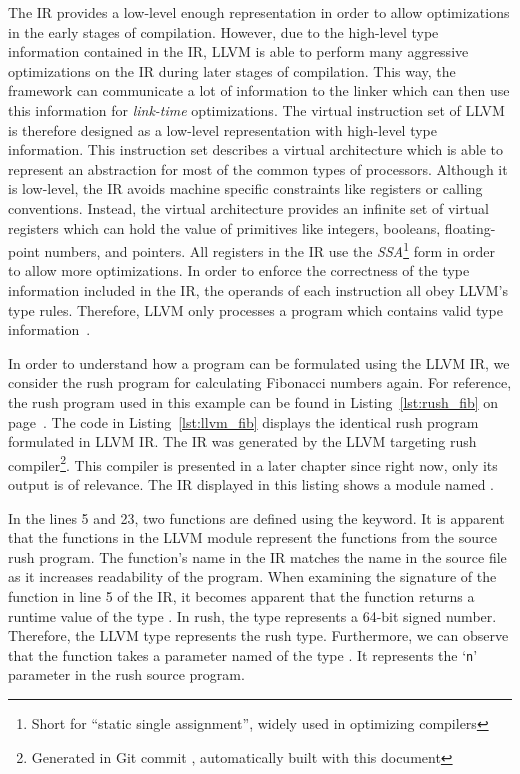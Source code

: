 The IR provides a low-level enough representation in order to allow optimizations in the early stages of compilation.
However, due to the high-level type information contained in the IR,
LLVM is able to perform many aggressive optimizations on the IR during later stages of compilation.
This way, the framework can communicate a lot of information to the linker which can then use this information for \emph{link-time} optimizations.
The virtual instruction set of LLVM is therefore designed as a low-level representation with high-level type information.
This instruction set describes a virtual architecture which is able to represent an abstraction for most of the common types of processors.
Although it is low-level, the IR avoids machine specific constraints like registers or calling conventions.
Instead, the virtual architecture provides an infinite set of virtual registers which can hold the value of primitives like integers, booleans, floating-point numbers, and pointers.
All registers in the IR use the \emph{SSA}\footnote{Short for \enquote{static single assignment}, widely used in optimizing compilers} form in order to allow more optimizations.
In order to enforce the correctness of the type information included in the IR, the operands of each instruction all obey LLVM's type rules.
Therefore, LLVM only processes a program which contains valid type information~\cite[p.~14-17]{Lattner:MSThesis02}.

In order to understand how a program can be formulated using the LLVM IR, we consider the rush program for calculating Fibonacci numbers again.
For reference, the rush program used in this example can be found in Listing~\ref{lst:rush_fib} on page~\pageref{lst:rush_fib}.
The code in Listing~\ref{lst:llvm_fib} displays the identical rush program formulated in LLVM IR\@.
The IR was generated by the LLVM targeting rush compiler\footnote{Generated in Git commit \rushCommit, automatically built with this document}.
This compiler is presented in a later chapter since right now, only its output is of relevance.
The IR displayed in this listing shows a module named .


In the lines 5 and 23, two functions are defined using the  keyword.
It is apparent that the functions in the LLVM module represent the functions from the source rush program.
The function's name in the IR matches the name in the source file as it increases readability of the program.
When examining the signature of the  function in line 5 of the IR,
it becomes apparent that the function returns a runtime value of the type .
In rush, the  type represents a 64-bit signed number.
Therefore, the  LLVM type represents the rush  type.
Furthermore, we can observe that the function takes a parameter named  of the type .
It represents the `\texttt{n}' parameter in the rush source program.

